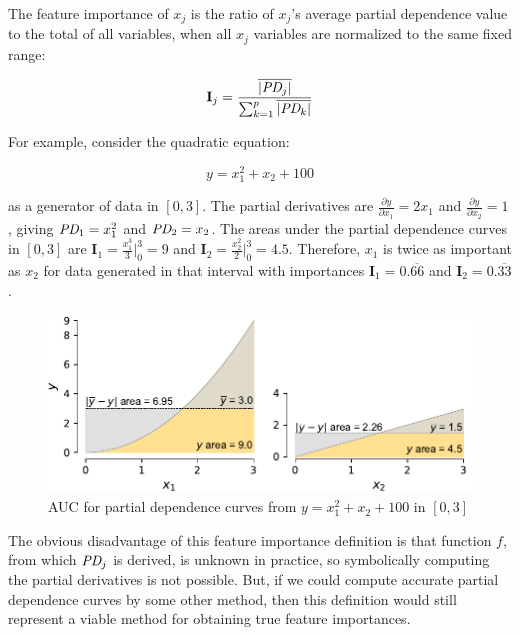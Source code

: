 \documentclass[12pt]{article}
\newcommand{\Imp}{\mathbf{I}}
\begin{document}
~\\
 The feature importance of $x_j$ is the ratio of $x_j$'s average partial dependence value to the total of all variables, when all $x_j$ variables are normalized to the same fixed range:

\begin{equation}\label{eq:Epd2a}
\Imp_j = \frac{\overline{|\text{\it PD}_j|}}{\sum_{k=1}^p \overline{|\text{\it PD}_k|}}
\end{equation}

\noindent For example, consider the quadratic equation:

\begin{equation}\label{eq:quad}
y = x_1^2 + x_2 + 100
\end{equation}

\noindent as a generator of data in $[0,3]$. The partial derivatives are $\frac{\partial y}{\partial x_1} = 2 x_1$ and $\frac{\partial y}{\partial x_2} = 1$, giving $\text{\it PD}_1 = x_1^2$ and $\text{\it PD}_2 = x_2$. The areas under the partial dependence curves in $[0,3]$ are $\Imp_1 = \frac{x_1^3}{3} \big |_0^3 = 9$ and $\Imp_2 = \frac{x_2^2}{2} \big |_0^3 = 4.5$.   Therefore, $x_1$ is twice as important as $x_2$ for data generated in that interval with importances $\Imp_1 = 0.\overline{66}$ and $\Imp_2 = 0.\overline{33}$.

\begin{figure}[htbp]
\begin{center}
\includegraphics[scale=0.5]{images/quadratic-auc.pdf}
\caption{AUC for partial dependence curves from $y = x_1^2 + x_2 + 100$ in $[0,3]$}
\label{fig:diff-models}
\end{center}
\end{figure}

The obvious disadvantage of this feature importance definition is that function $f$, from which $\text{\it PD}_j$ is derived, is unknown in practice, so symbolically computing the partial derivatives is not possible. But, if we could compute accurate partial dependence curves by some other method, then this definition would still represent a viable method for obtaining true feature importances. 
\end{document}
